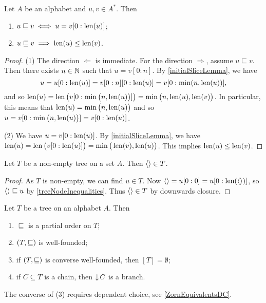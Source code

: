 \begin{lemma} \label{treeNodeInequalities}
Let $A$ be an alphabet and $u,v\in A^*$. Then
\begin{enumerate}
\item $u \sqsubseteq v \iff u = v[0:\operatorname{len}(u)]$;
\item $u \sqsubseteq v \implies \operatorname{len}(u) \leq \operatorname{len}(v)$.
\end{enumerate}
\end{lemma}
\begin{proof}
(1) The direction $\Leftarrow$ is immediate. For the direction $\Rightarrow$, assume $u \sqsubseteq v$. Then there exists $n\in \mathbb{N}$ such that $u = v[0:n]$. By \ref{initialSliceLemma}, we have
\[ u = u[0:\operatorname{len}(u)] = v[0:n][0:\operatorname{len}(u)] = v[0:\min(n,\operatorname{len}(u))], \]
and so $\operatorname{len}(u) = \operatorname{len}\big(v[0:\min\big(n,\operatorname{len}(u)\big)]\big) = \min\big(n,\operatorname{len}(u), \operatorname{len}(v)\big)$. In particular, this means that $\operatorname{len}(u) = \min\big(n,\operatorname{len}(u)\big)$ and so $u = v[0:\min\big(n,\operatorname{len}(u)\big)] = v[0:\operatorname{len}(u)]$.

(2) We have $u = v[0:\operatorname{len}(u)]$. By \ref{initialSliceLemma}, we have $\operatorname{len}(u) = \operatorname{len}\big(v[0:\operatorname{len}(u)]\big) = \min\big(\operatorname{len}(v), \operatorname{len}(u)\big)$. This implies $\operatorname{len}(u) \leq \operatorname{len}(v)$.
\end{proof}

\begin{lemma}
Let $T$ be a non-empty tree on a set $A$. Then $\left\langle  \right\rangle\in T$.
\end{lemma}
\begin{proof}
As $T$ is non-empty, we can find $u\in T$. Now $\left\langle  \right\rangle = u[0:0] = u[0:\operatorname{len}(\left\langle  \right\rangle)]$, so $\left\langle  \right\rangle\sqsubseteq u$ by \ref{treeNodeInequalities}. Thus $\left\langle  \right\rangle\in T$ by downwards closure.
\end{proof}

\begin{lemma} \label{treeOrderingLemma}
Let $T$ be a tree on an alphabet $A$. Then
\begin{enumerate}
\item $\sqsubseteq$ is a partial order on $T$;
\item $\left( T,\sqsubseteq \right)$ is well-founded;
\item if $\left( T,\sqsubseteq \right)$ is converse well-founded, then $[T] = \emptyset$;
\item if $C\subseteq T$ is a chain, then $\operatorname{\downarrow} C$ is a branch.
\end{enumerate}
\end{lemma}
The converse of (3) requires dependent choice, see \ref{ZornEquivalentsDC}.

